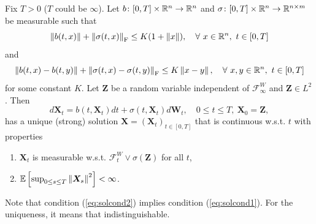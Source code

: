 \begin{thm}
    Fix $T > 0$ ($T$ could be $\infty$). Let $b \colon [0,T] \times \mathbb{R}^n \rightarrow \mathbb{R}^n$ and $\sigma \colon [0,T] \times \mathbb{R}^n \rightarrow \mathbb{R}^{n \times m}$ be measurable such that
    \begin{equation}\label{eq:solcond1}
        \left\lVert b(t,x)\right\lVert + \left\lVert\sigma(t,x)\right\lVert_{\operatorname{F}} \leq K(1 + \left\lVert x\right\lVert), \quad \forall~x \in \mathbb{R}^n,~t \in [0,T]
    \end{equation}
    and
    \begin{equation}\label{eq:solcond2}
        \left\lVert b(t,x)-b(t,y)\right\lVert + \left\lVert\sigma(t,x)-\sigma(t,y)\right\lVert_{\operatorname{F}} \leq K\left\lVert x-y\right\lVert,\quad \forall~x,y \in \mathbb{R}^n,~t \in [0,T]
    \end{equation}
    for some constant $K$. Let $\bm{Z}$ be a random variable independent of $\mathcal{F}^W_\infty$ and $\bm{Z} \in L^2$. Then
    \begin{equation*}
        d\bm{X}_t = b(t,\bm{X}_t)dt+\sigma(t,\bm{X}_t)d\bm{W}_t,\quad 0\leq t \leq T,~\bm{X}_0 = \bm{Z},
    \end{equation*}
    has a unique (strong) solution $\bm{X}=(\bm{X}_t)_{t \in [0,T]}$ that is continuous w.s.t. $t$ with properties
    \begin{enumerate}[label=(\roman*)]
        \item $\bm{X}_t$ is measurable w.s.t. $\mathcal{F}^W_t \vee \sigma(\bm{Z})$ for all $t$,
        \item $\mathbb{E}\left[\sup_{0 \leq s \leq T} \left\lVert\bm{X}_s\right\lVert^2\right] < \infty$.
    \end{enumerate}
\end{thm}
\begin{rmk}
    Note that condition (\ref{eq:solcond2}) implies condition (\ref{eq:solcond1}). For the uniqueness, it means that indistinguishable.
\end{rmk}
